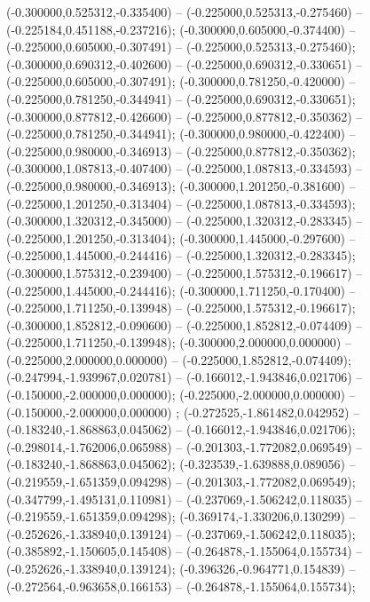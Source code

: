  (-0.300000,0.525312,-0.335400) -- (-0.225000,0.525313,-0.275460) -- (-0.225184,0.451188,-0.237216);
 (-0.300000,0.605000,-0.374400) -- (-0.225000,0.605000,-0.307491) -- (-0.225000,0.525313,-0.275460);
 (-0.300000,0.690312,-0.402600) -- (-0.225000,0.690312,-0.330651) -- (-0.225000,0.605000,-0.307491);
 (-0.300000,0.781250,-0.420000) -- (-0.225000,0.781250,-0.344941) -- (-0.225000,0.690312,-0.330651);
 (-0.300000,0.877812,-0.426600) -- (-0.225000,0.877812,-0.350362) -- (-0.225000,0.781250,-0.344941);
 (-0.300000,0.980000,-0.422400) -- (-0.225000,0.980000,-0.346913) -- (-0.225000,0.877812,-0.350362);
 (-0.300000,1.087813,-0.407400) -- (-0.225000,1.087813,-0.334593) -- (-0.225000,0.980000,-0.346913);
 (-0.300000,1.201250,-0.381600) -- (-0.225000,1.201250,-0.313404) -- (-0.225000,1.087813,-0.334593);
 (-0.300000,1.320312,-0.345000) -- (-0.225000,1.320312,-0.283345) -- (-0.225000,1.201250,-0.313404);
 (-0.300000,1.445000,-0.297600) -- (-0.225000,1.445000,-0.244416) -- (-0.225000,1.320312,-0.283345);
 (-0.300000,1.575312,-0.239400) -- (-0.225000,1.575312,-0.196617) -- (-0.225000,1.445000,-0.244416);
 (-0.300000,1.711250,-0.170400) -- (-0.225000,1.711250,-0.139948) -- (-0.225000,1.575312,-0.196617);
 (-0.300000,1.852812,-0.090600) -- (-0.225000,1.852812,-0.074409) -- (-0.225000,1.711250,-0.139948);
 (-0.300000,2.000000,0.000000) -- (-0.225000,2.000000,0.000000) -- (-0.225000,1.852812,-0.074409);
 (-0.247994,-1.939967,0.020781) -- (-0.166012,-1.943846,0.021706) -- (-0.150000,-2.000000,0.000000);
 (-0.225000,-2.000000,0.000000) -- (-0.150000,-2.000000,0.000000) ;
 (-0.272525,-1.861482,0.042952) -- (-0.183240,-1.868863,0.045062) -- (-0.166012,-1.943846,0.021706);
 (-0.298014,-1.762006,0.065988) -- (-0.201303,-1.772082,0.069549) -- (-0.183240,-1.868863,0.045062);
 (-0.323539,-1.639888,0.089056) -- (-0.219559,-1.651359,0.094298) -- (-0.201303,-1.772082,0.069549);
 (-0.347799,-1.495131,0.110981) -- (-0.237069,-1.506242,0.118035) -- (-0.219559,-1.651359,0.094298);
 (-0.369174,-1.330206,0.130299) -- (-0.252626,-1.338940,0.139124) -- (-0.237069,-1.506242,0.118035);
 (-0.385892,-1.150605,0.145408) -- (-0.264878,-1.155064,0.155734) -- (-0.252626,-1.338940,0.139124);
 (-0.396326,-0.964771,0.154839) -- (-0.272564,-0.963658,0.166153) -- (-0.264878,-1.155064,0.155734);
